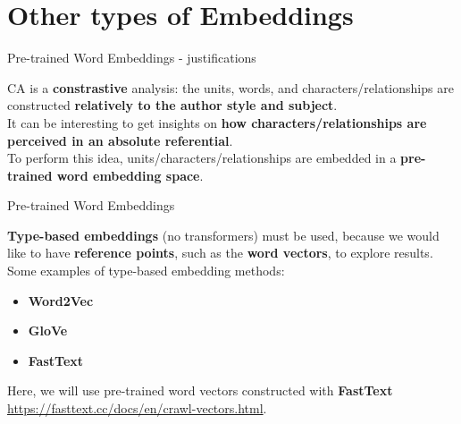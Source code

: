 \documentclass[10pt]{beamer}
\newcommand{\imp}[1]{\textbf{\color{cyan}#1}}
\begin{document}
	
	\section[Other types of Embeddings]{Other types of Embeddings}
	
	
	\begin{frame}{Pre-trained Word Embeddings - justifications}
		
		CA is a \imp{constrastive} analysis: the units, words, and characters/relationships are constructed \imp{relatively to the author style and subject}. \\
		\vspace{0.4cm}
		It can be interesting to get insights on \imp{how characters/relationships are perceived in an absolute referential}. \\
		\vspace{0.4cm}
		To perform this idea, units/characters/relationships are embedded in a \imp{pre-trained word embedding space}.
		
	\end{frame}
	
	
	\begin{frame}{Pre-trained Word Embeddings}
		
		\imp{Type-based embeddings} (no transformers) must be used, because we would like to have \imp{reference points}, such as the \imp{word vectors}, to explore results. \\
		\vspace{0.3cm}
		Some examples of type-based embedding methods:
		\begin{itemize}
			\item \imp{Word2Vec} \cite{mikolov_efficient_2013}
			\item \imp{GloVe} \cite{pennington_glove_2014}
			\item \imp{FastText} \cite{bojanowski_enriching_2017}
		\end{itemize}
		Here, we will use pre-trained word vectors constructed with \imp{FastText} {\color{blue} \url{https://fasttext.cc/docs/en/crawl-vectors.html}}.
		
	\end{frame}
	
	
\end{document}
